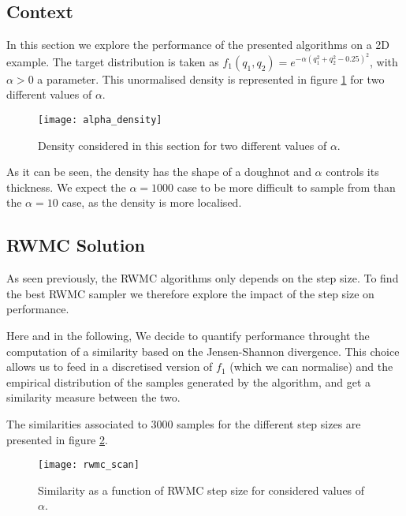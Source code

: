 \documentclass[a4paper, 12pt,oneside]{article}
\begin{document}
		\subsection{Context}
		In this section we explore the performance of the presented algorithms on a 2D example. The target distribution is taken as $f_1(q_1,q_2)=e^{-\alpha(q_1^2+q_2^2-0.25)^2}$, with $\alpha>0$ a parameter. This unormalised density is represented in figure \ref{fig:alpha-density} for two different values of $\alpha$.
        \begin{figure}[htb]
            \centering
                \vspace{0em}
                \texttt{[image: alpha\_density]}
                \caption{Density considered in this section for two different values of $\alpha$.}
                \label{fig:alpha-density}
        \end{figure}
		As it can be seen, the density has the shape of a doughnot and $\alpha$ controls its thickness. We expect the $\alpha=1000$ case to be more difficult to sample from than the $\alpha=10$ case, as the density is more localised.
		\subsection{RWMC Solution}
			As seen previously, the RWMC algorithms only depends on the step size. To find the best RWMC sampler we therefore explore the impact of the step size on performance. 
			
			Here and in the following, We decide to quantify performance throught the computation of a similarity based on the Jensen-Shannon divergence. This choice allows us to feed in a discretised version of $f_1$ (which we can normalise) and the empirical distribution of the samples generated by the algorithm, and get a similarity measure between the two.

			The similarities associated to 3000 samples for the different step sizes are presented in figure \ref{fig:rwmc-scan}.
			\begin{figure}[htb]
				\centering
					\vspace{0em}
					\texttt{[image: rwmc\_scan]}
					\caption{Similarity as a function of RWMC step size for considered values of $\alpha$.}
					\label{fig:rwmc-scan}
			\end{figure}
\end{document}
